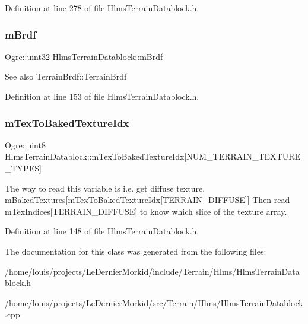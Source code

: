 Definition at line 278 of file Hlms\+Terrain\+Datablock.\+h.

\mbox{\label{class_hlms_terrain_datablock_aec0c1743fab32d302e794a1149139443}} 
\subsubsection{\texorpdfstring{m\+Brdf}{mBrdf}}
{\footnotesize\ttfamily Ogre\+::uint32 Hlms\+Terrain\+Datablock\+::m\+Brdf\hspace{0.3cm}{\ttfamily [protected]}}

\begin{DoxySeeAlso}{See also}
Terrain\+Brdf\+::\+Terrain\+Brdf 
\end{DoxySeeAlso}


Definition at line 153 of file Hlms\+Terrain\+Datablock.\+h.

\mbox{\label{class_hlms_terrain_datablock_acb2652e4731f6cf65b232393531b1d11}} 
\subsubsection{\texorpdfstring{m\+Tex\+To\+Baked\+Texture\+Idx}{mTexToBakedTextureIdx}}
{\footnotesize\ttfamily Ogre\+::uint8 Hlms\+Terrain\+Datablock\+::m\+Tex\+To\+Baked\+Texture\+Idx\mbox{[}N\+U\+M\+\_\+\+T\+E\+R\+R\+A\+I\+N\+\_\+\+T\+E\+X\+T\+U\+R\+E\+\_\+\+T\+Y\+P\+ES\mbox{]}\hspace{0.3cm}{\ttfamily [protected]}}

The way to read this variable is i.\+e. get diffuse texture, m\+Baked\+Textures\mbox{[}m\+Tex\+To\+Baked\+Texture\+Idx\mbox{[}T\+E\+R\+R\+A\+I\+N\+\_\+\+D\+I\+F\+F\+U\+SE\mbox{]}\mbox{]} Then read m\+Tex\+Indices\mbox{[}T\+E\+R\+R\+A\+I\+N\+\_\+\+D\+I\+F\+F\+U\+SE\mbox{]} to know which slice of the texture array. 

Definition at line 148 of file Hlms\+Terrain\+Datablock.\+h.



The documentation for this class was generated from the following files\+:\begin{DoxyCompactItemize}
\item 
/home/louis/projects/\+Le\+Dernier\+Morkid/include/\+Terrain/\+Hlms/Hlms\+Terrain\+Datablock.\+h\item 
/home/louis/projects/\+Le\+Dernier\+Morkid/src/\+Terrain/\+Hlms/Hlms\+Terrain\+Datablock.\+cpp\end{DoxyCompactItemize}
